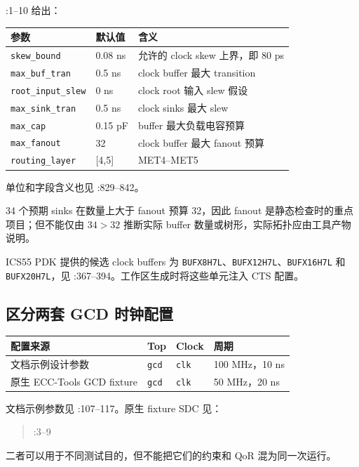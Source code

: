 \documentclass[UTF8,a4paper,11pt,fontset=fandol]{ctexart}
\newcommand{\code}[1]{\nolinkurl{#1}}
\begin{document}
:1--10 给出：
\begin{center}
\begin{tabular}{lll}
\toprule
参数 & 默认值 & 含义 \\
\midrule
\code{skew_bound} & 0.08 ns & 允许的 clock skew 上界，即 80 ps \\
\code{max_buf_tran} & 0.5 ns & clock buffer 最大 transition \\
\code{root_input_slew} & 0 ns & clock root 输入 slew 假设 \\
\code{max_sink_tran} & 0.5 ns & clock sinks 最大 slew \\
\code{max_cap} & 0.15 pF & buffer 最大负载电容预算 \\
\code{max_fanout} & 32 & clock buffer 最大 fanout 预算 \\
\code{routing_layer} & [4,5] & MET4--MET5 \\
\bottomrule
\end{tabular}
\end{center}

单位和字段含义也见 :829--842。

34 个预期 sinks 在数量上大于 fanout 预算 32，因此 fanout 是静态检查时的重点项目；但不能仅由 $34>32$ 推断实际 buffer 数量或树形，实际拓扑应由工具产物说明。

ICS55 PDK 提供的候选 clock buffers 为 \code{BUFX8H7L}、\code{BUFX12H7L}、\code{BUFX16H7L} 和 \code{BUFX20H7L}，见 :367--394。工作区生成时将这些单元注入 CTS 配置。

\subsection{区分两套 GCD 时钟配置}

\begin{center}
\begin{tabularx}{\textwidth}{p{}llX}
\toprule
配置来源 & Top & Clock & 周期 \\
\midrule
文档示例设计参数 & \code{gcd} & \code{clk} & 100 MHz，10 ns \\
原生 ECC-Tools GCD fixture & \code{gcd} & \code{clk} & 50 MHz，20 ns \\
\bottomrule
\end{tabularx}
\end{center}

文档示例参数见 :107--117。原生 fixture SDC 见：
\begin{quote}
:3--9
\end{quote}
二者可以用于不同测试目的，但不能把它们的约束和 QoR 混为同一次运行。
\end{document}
